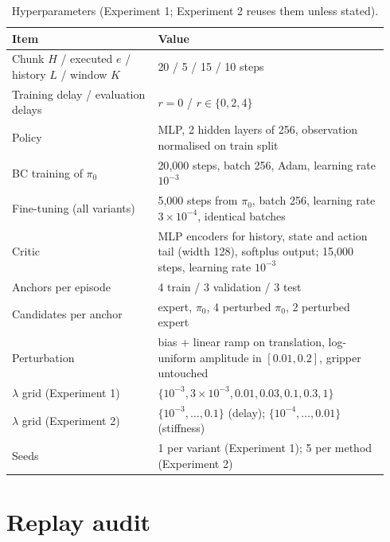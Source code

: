 \begin{table}[h]
  \centering
  \small
  \caption{Hyperparameters (Experiment 1; Experiment 2 reuses them unless stated).}
  \begin{tabular}{p{0.36\linewidth}p{0.58\linewidth}}
    \toprule
    Item & Value \\
    \midrule
    Chunk $H$ / executed $e$ / history $L$ / window $K$ & 20 / 5 / 15 / 10 steps \\
    Training delay / evaluation delays & $r=0$ / $r\in\{0,2,4\}$ \\
    Policy & MLP, 2 hidden layers of 256, observation normalised on train split \\
    BC training of $\pi_0$ & 20{,}000 steps, batch 256, Adam, learning rate $10^{-3}$ \\
    Fine-tuning (all variants) & 5{,}000 steps from $\pi_0$, batch 256, learning rate $3\times10^{-4}$, identical batches \\
    Critic & MLP encoders for history, state and action tail (width 128), softplus output; 15{,}000 steps, learning rate $10^{-3}$ \\
    Anchors per episode & 4 train / 3 validation / 3 test \\
    Candidates per anchor & expert, $\pi_0$, 4 perturbed $\pi_0$, 2 perturbed expert \\
    Perturbation & bias + linear ramp on translation, log-uniform amplitude in $[0.01, 0.2]$, gripper untouched \\
    $\lambda$ grid (Experiment 1) & $\{10^{-3}, 3\times10^{-3}, 0.01, 0.03, 0.1, 0.3, 1\}$ \\
    $\lambda$ grid (Experiment 2) & $\{10^{-3},\dots,0.1\}$ (delay); $\{10^{-4},\dots,0.01\}$ (stiffness) \\
    Seeds & 1 per variant (Experiment 1); 5 per method (Experiment 2) \\
    \bottomrule
  \end{tabular}
\end{table}

\section{Replay audit}
\label{app:audit}

